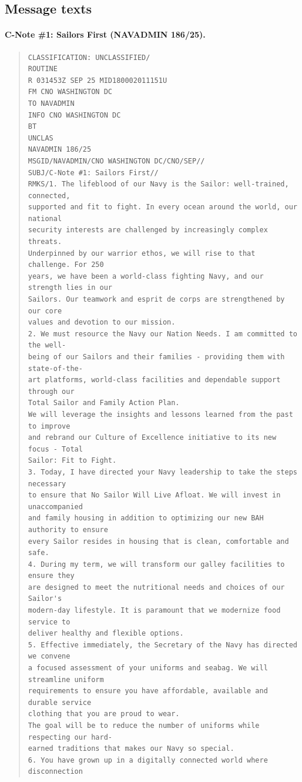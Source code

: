 \documentclass[../main.tex]{subfiles}
\begin{document}
\subsection{Message texts}
\paragraph{C-Note \#1: Sailors First (NAVADMIN 186/25).}
\begin{quote}\small\begin{verbatim}
CLASSIFICATION: UNCLASSIFIED/
ROUTINE
R 031453Z SEP 25 MID180002011151U
FM CNO WASHINGTON DC
TO NAVADMIN
INFO CNO WASHINGTON DC
BT
UNCLAS
NAVADMIN 186/25
MSGID/NAVADMIN/CNO WASHINGTON DC/CNO/SEP//
SUBJ/C-Note #1: Sailors First//
RMKS/1. The lifeblood of our Navy is the Sailor: well-trained, connected,
supported and fit to fight. In every ocean around the world, our national
security interests are challenged by increasingly complex threats.
Underpinned by our warrior ethos, we will rise to that challenge. For 250
years, we have been a world-class fighting Navy, and our strength lies in our
Sailors. Our teamwork and esprit de corps are strengthened by our core
values and devotion to our mission.
2. We must resource the Navy our Nation Needs. I am committed to the well-
being of our Sailors and their families - providing them with state-of-the-
art platforms, world-class facilities and dependable support through our
Total Sailor and Family Action Plan.
We will leverage the insights and lessons learned from the past to improve
and rebrand our Culture of Excellence initiative to its new focus - Total
Sailor: Fit to Fight.
3. Today, I have directed your Navy leadership to take the steps necessary
to ensure that No Sailor Will Live Afloat. We will invest in unaccompanied
and family housing in addition to optimizing our new BAH authority to ensure
every Sailor resides in housing that is clean, comfortable and safe.
4. During my term, we will transform our galley facilities to ensure they
are designed to meet the nutritional needs and choices of our Sailor's
modern-day lifestyle. It is paramount that we modernize food service to
deliver healthy and flexible options.
5. Effective immediately, the Secretary of the Navy has directed we convene
a focused assessment of your uniforms and seabag. We will streamline uniform
requirements to ensure you have affordable, available and durable service
clothing that you are proud to wear.
The goal will be to reduce the number of uniforms while respecting our hard-
earned traditions that makes our Navy so special.
6. You have grown up in a digitally connected world where disconnection

\end{verbatim}
\end{quote}
\end{document}

